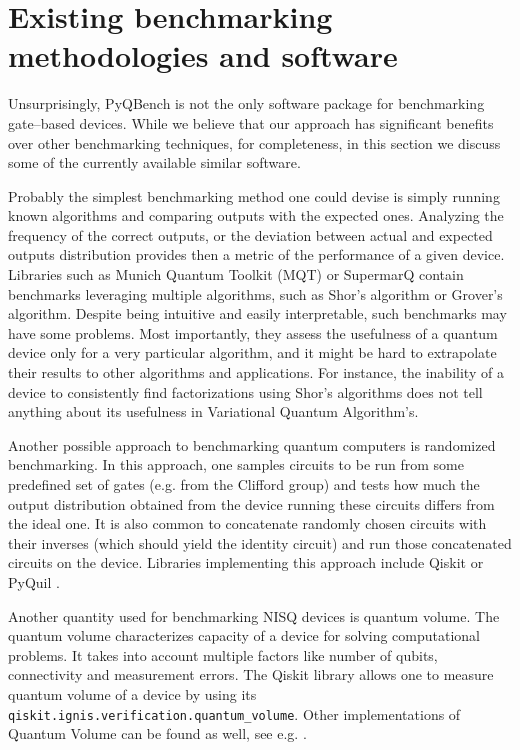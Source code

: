 \documentclass[preprint,12pt, a4paper, dvipsnames]{elsarticle}
\newcommand{\1}{{\rm 1\hspace{-0.9mm}l}}
\theoremstyle{definition}
\begin{document}
\section{Existing benchmarking methodologies and software}
Unsurprisingly, PyQBench is not the only software package for benchmarking gate--based devices.
While we believe that our approach has significant benefits over other benchmarking techniques, for
completeness, in this section we discuss some of the currently available similar software.

Probably the simplest benchmarking method one could devise is simply running known algorithms and
comparing outputs with the expected ones. Analyzing the frequency of the correct outputs, or the
deviation between actual and expected outputs distribution provides then a metric of the performance
of a given device.
 Libraries such as Munich Quantum Toolkit (MQT) \cite{mqt2022, mqt-bench}
or
 SupermarQ \cite{supermarq, supermarkq-github}
  contain
benchmarks leveraging multiple algorithms, such as Shor's algorithm or Grover's algorithm.
Despite being intuitive and easily interpretable, such benchmarks may have some problems. Most
importantly, they assess the usefulness of a quantum device only for a very particular algorithm,
and it might be hard to extrapolate their results to other algorithms and applications. For
instance, the inability of a device to consistently find factorizations using Shor's algorithms
does not tell anything about its usefulness in Variational Quantum Algorithm's.



Another possible approach to benchmarking quantum computers is randomized benchmarking. In this approach, one samples circuits to be run from some predefined set
of gates (e.g. from the Clifford group) and tests how much the output distribution obtained from the
device running these circuits differs from the ideal one. It is also common to concatenate randomly
chosen circuits with their inverses (which should yield the identity circuit) and run those
concatenated circuits on the device. Libraries implementing this approach include Qiskit \cite{qiskit-randomized} or PyQuil \cite{forest-benchmarking}.


Another quantity used for benchmarking NISQ devices is quantum volume. The quantum volume
characterizes capacity of a device for solving computational problems. It takes into account
multiple factors like number of qubits, connectivity and measurement errors. The Qiskit library allows one to
measure quantum volume of a device by using its \texttt{qiskit.ignis.verification.quantum\_volume}.
Other implementations of Quantum Volume can be found as well, see e.g. \cite{volume-in-practice}.
\end{document}
